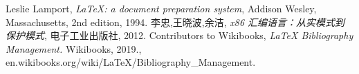 \documentclass[a4paper, 11pt]{article} %
\begin{document}
\begin{thebibliography}{99}

    Leslie Lamport,
    \textit{\LaTeX: a document preparation system},
    Addison Wesley, Massachusetts,
    2nd edition,
    1994.
    李忠,王晓波,余洁,
    \textit{x86 汇编语言：从实模式到保护模式},
		电子工业出版社,
    2012.
    Contributors to Wikibooks,
    \textit{LaTeX Bibliography Management.}
    Wikibooks,
    2019., \\
    en.wikibooks.org/wiki/LaTeX/Bibliography\_Management.


\end{thebibliography}

\end{document}
